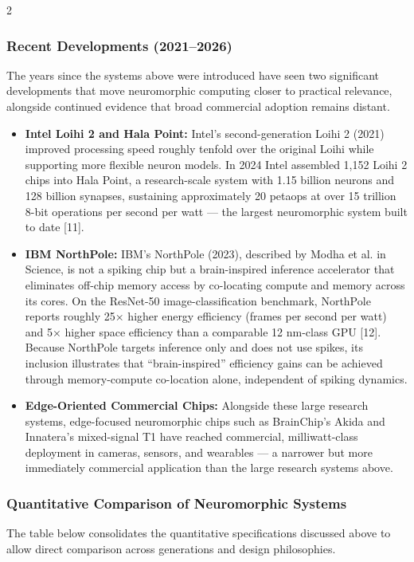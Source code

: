 \begin{multicols}{2}
  \subsubsection*{Recent Developments (2021–2026)}
  The years since the systems above were introduced have seen two significant developments that move neuromorphic computing closer to practical relevance, alongside continued evidence that broad commercial adoption remains distant.
  \begin{itemize}\justifying
    \item \textbf{Intel Loihi 2 and Hala Point:} Intel's second-generation Loihi 2 (2021) improved processing speed roughly tenfold over the original Loihi while supporting more flexible neuron models. In 2024 Intel assembled 1,152 Loihi 2 chips into Hala Point, a research-scale system with 1.15 billion neurons and 128 billion synapses, sustaining approximately 20 petaops at over 15 trillion 8-bit operations per second per watt — the largest neuromorphic system built to date [11].
    \item \textbf{IBM NorthPole:} IBM's NorthPole (2023), described by Modha et al. in Science, is not a spiking chip but a brain-inspired inference accelerator that eliminates off-chip memory access by co-locating compute and memory across its cores. On the ResNet-50 image-classification benchmark, NorthPole reports roughly 25× higher energy efficiency (frames per second per watt) and 5× higher space efficiency than a comparable 12 nm-class GPU [12]. Because NorthPole targets inference only and does not use spikes, its inclusion illustrates that “brain-inspired” efficiency gains can be achieved through memory-compute co-location alone, independent of spiking dynamics.
    \item \textbf{Edge-Oriented Commercial Chips:} Alongside these large research systems, edge-focused neuromorphic chips such as BrainChip's Akida and Innatera's mixed-signal T1 have reached commercial, milliwatt-class deployment in cameras, sensors, and wearables — a narrower but more immediately commercial application than the large research systems above.
  \end{itemize}

  \subsubsection*{Quantitative Comparison of Neuromorphic Systems}
  The table below consolidates the quantitative specifications discussed above to allow direct comparison across generations and design philosophies.


\end{multicols}
